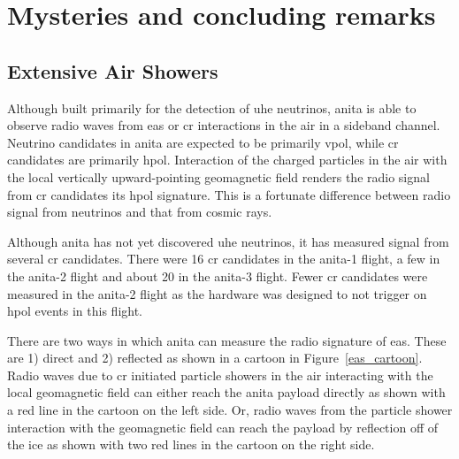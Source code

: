 \chapter{Mysteries and concluding remarks}
\label{wild}

\section{Extensive Air Showers}
\label{unusual}

Although built primarily for the detection of \gls{uhe} neutrinos, \gls{anita} is able to observe radio waves from \gls{eas} or \gls{cr} interactions in the air in a sideband channel. 
Neutrino candidates in \gls{anita} are expected to be primarily \gls{vpol}, while \gls{cr} candidates are primarily \gls{hpol}.
Interaction of the charged particles in the air with the local vertically upward-pointing geomagnetic field renders the radio signal from \gls{cr} candidates its \gls{hpol} signature. 
This is a fortunate difference between radio signal from neutrinos and that from cosmic rays. 

Although \gls{anita} has not yet discovered \gls{uhe} neutrinos, it has measured signal from several \gls{cr} candidates. There were 16 \gls{cr} candidates in the \gls{anita}-1 flight, a few in the \gls{anita}-2 flight and about 20 in the \gls{anita}-3 flight. Fewer \gls{cr} candidates were measured in the \gls{anita}-2 flight as the hardware was designed to not trigger on \gls{hpol} events in this flight. 

There are two ways in which \gls{anita} can measure the radio signature of \gls{eas}. These are 1) direct and 2) reflected as shown in a cartoon in Figure~\ref{eas_cartoon}. Radio waves due to \gls{cr} initiated particle showers in the air interacting with the local geomagnetic field can either reach the \gls{anita} payload directly as shown with a red line in the cartoon on the left side. Or, radio waves from the particle shower interaction with the geomagnetic field can reach the payload by reflection off of the ice as shown with two red lines in the cartoon on the right side.

